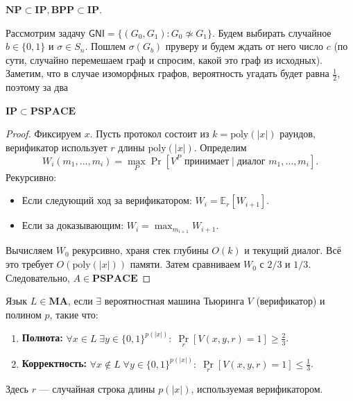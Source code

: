 \begin{note}
    \(\mathbf{NP} \subset \mathbf{IP}, \mathbf{BPP} \subset \mathbf{IP}\).
\end{note}

\begin{example}
    Рассмотрим задачу \(\mathsf{GNI} = \{(G_0, G_1): G_0 \not\simeq G_1\}\). Будем выбирать случайное \(b \in \{0, 1\}\) и \(\sigma \in S_n\). Пошлем \(\sigma(G_b)\) пруверу и будем ждать от него число \(c\) (по сути, случайно перемешаем граф и спросим, какой это граф из исходных). Заметим, что в случае изоморфных графов, вероятность угадать будет равна \(\frac{1}{2}\), поэтому за два 
\end{example}


\begin{theorem}
    $\mathbf{IP} \subset \mathbf{PSPACE}$
\end{theorem}
\begin{proof}
    Фиксируем $x$. Пусть протокол состоит из $k = \mathrm{poly}(|x|)$ раундов, верификатор использует $r$ длины $\mathrm{poly}(|x|)$. Определим
    \[
    W_i(m_1,\dots,m_i) = \max_{P} \Pr[V^P\text{ принимает} \mid \text{диалог }m_1,\dots,m_i].
    \]
    Рекурсивно:
    \begin{itemize}
        \item Если следующий ход за верификатором: $W_i = \mathbb{E}_{r}[W_{i+1}]$.
        \item Если за доказывающим: $W_i = \max_{m_{i+1}} W_{i+1}$.
    \end{itemize}
    Вычисляем $W_0$ рекурсивно, храня стек глубины $O(k)$ и текущий диалог. Всё это требует $O(\mathrm{poly}(|x|))$ памяти. Затем сравниваем $W_0$ с $2/3$ и $1/3$. Следовательно, $A \in \mathbf{PSPACE}$
\end{proof}

\begin{definition}
    Язык \(L \in \mathbf{MA}\), если \(\exists\) вероятностная машина Тьюринга \(V\) (верификатор) и полином \(p\), такие что:
    \begin{enumerate}
        \item \textbf{Полнота:} \(\forall x \in L \; \exists y \in \{0,1\}^{p(|x|)}:\; \Pr\limits_{r}[V(x,y,r)=1] \ge \frac{2}{3}\).
        \item \textbf{Корректность:} \(\forall x \notin L \; \forall y \in \{0,1\}^{p(|x|)}:\; \Pr\limits_{r}[V(x,y,r)=1] \le \frac{1}{3}\).
    \end{enumerate}
    Здесь \(r\) — случайная строка длины \(p(|x|)\), используемая верификатором.
\end{definition}

